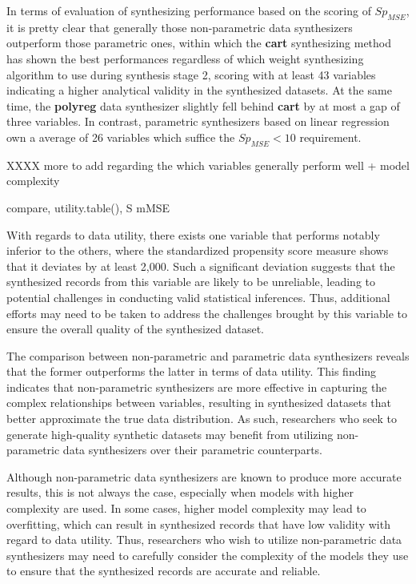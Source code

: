 In terms of evaluation of synthesizing performance based on the scoring of $Sp_{MSE}$, it is pretty clear that generally those non-parametric data synthesizers outperform those parametric ones, within which the \textbf{cart} synthesizing method has shown the best performances regardless of which weight synthesizing algorithm to use during synthesis stage 2, scoring with at least 43 variables indicating a higher analytical validity in the synthesized datasets. At the same time, the \textbf{polyreg} data synthesizer slightly fell behind \textbf{cart} by at most a gap of three variables. In contrast, parametric synthesizers based on linear regression own a average of 26 variables which suffice the $Sp_{MSE}<10$ requirement. 

XXXX more to add regarding the which variables generally perform well + model complexity

compare, utility.table(), S mMSE

With regards to data utility, there exists one variable that performs notably inferior to the others, where the standardized propensity score measure shows that it deviates by at least 2,000. Such a significant deviation suggests that the synthesized records from this variable are likely to be unreliable, leading to potential challenges in conducting valid statistical inferences. Thus, additional efforts may need to be taken to address the challenges brought by this variable to ensure the overall quality of the synthesized dataset.

The comparison between non-parametric and parametric data synthesizers reveals that the former outperforms the latter in terms of data utility. This finding indicates that non-parametric synthesizers are more effective in capturing the complex relationships between variables, resulting in synthesized datasets that better approximate the true data distribution. As such, researchers who seek to generate high-quality synthetic datasets may benefit from utilizing non-parametric data synthesizers over their parametric counterparts.

Although non-parametric data synthesizers are known to produce more accurate results, this is not always the case, especially when models with higher complexity are used. In some cases, higher model complexity may lead to overfitting, which can result in synthesized records that have low validity with regard to data utility. Thus, researchers who wish to utilize non-parametric data synthesizers may need to carefully consider the complexity of the models they use to ensure that the synthesized records are accurate and reliable.

